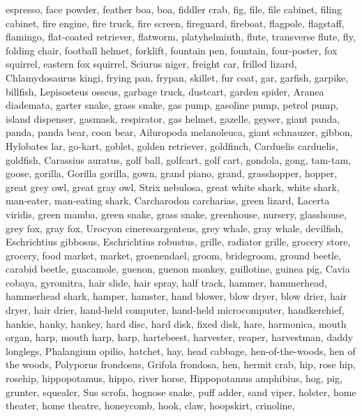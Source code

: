 \documentclass{article}
\begin{document}
{{espresso},
{face powder},
{feather boa, boa},
{fiddler crab},
{fig},
{file, file cabinet, filing cabinet},
{fire engine, fire truck},
{fire screen, fireguard},
{fireboat},
{flagpole, flagstaff},
{flamingo},
{flat-coated retriever},
{flatworm, platyhelminth},
{flute, transverse flute},
{fly},
{folding chair},
{football helmet},
{forklift},
{fountain pen},
{fountain},
{four-poster},
{fox squirrel, eastern fox squirrel, Sciurus niger},
{freight car},
{frilled lizard, Chlamydosaurus kingi},
{frying pan, frypan, skillet},
{fur coat},
{gar, garfish, garpike, billfish, Lepisosteus osseus},
{garbage truck, dustcart},
{garden spider, Aranea diademata},
{garter snake, grass snake},
{gas pump, gasoline pump, petrol pump, island dispenser},
{gasmask, respirator, gas helmet},
{gazelle},
{geyser},
{giant panda, panda, panda bear, coon bear, Ailuropoda melanoleuca},
{giant schnauzer},
{gibbon, Hylobates lar},
{go-kart},
{goblet},
{golden retriever},
{goldfinch, Carduelis carduelis},
{goldfish, Carassius auratus},
{golf ball},
{golfcart, golf cart},
{gondola},
{gong, tam-tam},
{goose},
{gorilla, Gorilla gorilla},
{gown},
{grand piano, grand},
{grasshopper, hopper},
{great grey owl, great gray owl, Strix nebulosa},
{great white shark, white shark, man-eater, man-eating shark, Carcharodon carcharias},
{green lizard, Lacerta viridis},
{green mamba},
{green snake, grass snake},
{greenhouse, nursery, glasshouse},
{grey fox, gray fox, Urocyon cinereoargenteus},
{grey whale, gray whale, devilfish, Eschrichtius gibbosus, Eschrichtius robustus},
{grille, radiator grille},
{grocery store, grocery, food market, market},
{groenendael},
{groom, bridegroom},
{ground beetle, carabid beetle},
{guacamole},
{guenon, guenon monkey},
{guillotine},
{guinea pig, Cavia cobaya},
{gyromitra},
{hair slide},
{hair spray},
{half track},
{hammer},
{hammerhead, hammerhead shark},
{hamper},
{hamster},
{hand blower, blow dryer, blow drier, hair dryer, hair drier},
{hand-held computer, hand-held microcomputer},
{handkerchief, hankie, hanky, hankey},
{hard disc, hard disk, fixed disk},
{hare},
{harmonica, mouth organ, harp, mouth harp},
{harp},
{hartebeest},
{harvester, reaper},
{harvestman, daddy longlegs, Phalangium opilio},
{hatchet},
{hay},
{head cabbage},
{hen-of-the-woods, hen of the woods, Polyporus frondosus, Grifola frondosa},
{hen},
{hermit crab},
{hip, rose hip, rosehip},
{hippopotamus, hippo, river horse, Hippopotamus amphibius},
{hog, pig, grunter, squealer, Sus scrofa},
{hognose snake, puff adder, sand viper},
{holster},
{home theater, home theatre},
{honeycomb},
{hook, claw},
{hoopskirt, crinoline},
}
\end{document}
